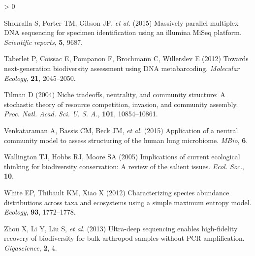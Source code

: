 \documentclass[
]{article}
\newlength{\cslhangindent}
\newenvironment{CSLReferences}[2] %
 {%
  \setlength{\parindent}{0pt}
  \ifodd #1 \everypar{\setlength{\hangindent}{\cslhangindent}}\ignorespaces\fi
  \ifnum #2 > 0
  \setlength{\parskip}{#2\baselineskip}
  \fi
 }%
 {}
\begin{document}
\begin{CSLReferences}{1}{0}
\leavevmode\hypertarget{ref-shokralla2015}{}%
Shokralla S, Porter TM, Gibson JF, \emph{et al.} (2015) Massively
parallel multiplex DNA sequencing for specimen identification using an
illumina MiSeq platform. \emph{Scientific reports}, \textbf{5}, 9687.

\leavevmode\hypertarget{ref-taberlet2012}{}%
Taberlet P, Coissac E, Pompanon F, Brochmann C, Willerslev E (2012)
Towards next-generation biodiversity assessment using DNA metabarcoding.
\emph{Molecular Ecology}, \textbf{21}, 2045--2050.

\leavevmode\hypertarget{ref-tilman2004}{}%
Tilman D (2004) Niche tradeoffs, neutrality, and community structure: A
stochastic theory of resource competition, invasion, and community
assembly. \emph{Proc. Natl. Acad. Sci. U. S. A.}, \textbf{101},
10854--10861.

\leavevmode\hypertarget{ref-venkataraman2015}{}%
Venkataraman A, Bassis CM, Beck JM, \emph{et al.} (2015) Application of
a neutral community model to assess structuring of the human lung
microbiome. \emph{MBio}, \textbf{6}.

\leavevmode\hypertarget{ref-wallington2005}{}%
Wallington TJ, Hobbs RJ, Moore SA (2005) Implications of current
ecological thinking for biodiversity conservation: A review of the
salient issues. \emph{Ecol. Soc.}, \textbf{10}.

\leavevmode\hypertarget{ref-white2012}{}%
White EP, Thibault KM, Xiao X (2012) Characterizing species abundance
distributions across taxa and ecosystems using a simple maximum entropy
model. \emph{Ecology}, \textbf{93}, 1772--1778.

\leavevmode\hypertarget{ref-zhou2013}{}%
Zhou X, Li Y, Liu S, \emph{et al.} (2013) Ultra-deep sequencing enables
high-fidelity recovery of biodiversity for bulk arthropod samples
without PCR amplification. \emph{Gigascience}, \textbf{2}, 4.

\end{CSLReferences}
\end{document}
